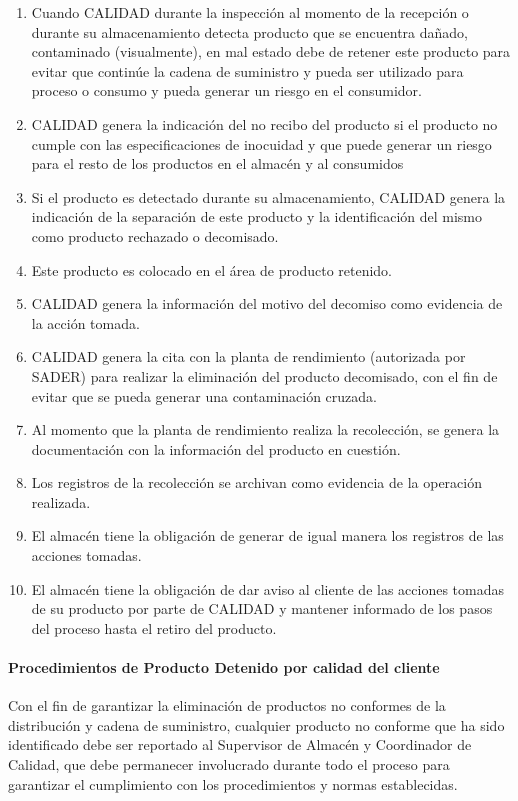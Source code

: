 \begin{enumerate}
	\item Cuando CALIDAD durante la inspección al momento de la recepción o durante su almacenamiento detecta producto que se encuentra dañado, contaminado (visualmente), en mal estado debe de retener este producto para evitar que continúe la cadena de suministro y pueda ser utilizado para proceso o consumo y pueda generar un riesgo en el consumidor.
	\item CALIDAD genera la indicación del no recibo del producto si el producto no cumple con las especificaciones de inocuidad y que puede generar un riesgo para el resto de los productos en el almacén y al consumidos
	\item Si el producto es detectado durante su almacenamiento, CALIDAD genera la indicación de la separación de este producto y la identificación del mismo como producto rechazado o decomisado.
	\item Este producto es colocado en el área de producto retenido.
	\item CALIDAD genera la información del motivo del decomiso como evidencia de la acción tomada.
	\item CALIDAD genera la cita con la planta de rendimiento (autorizada por SADER) para realizar la eliminación del producto decomisado, con el fin de evitar que se pueda generar una contaminación cruzada.
	\item Al momento que la planta de rendimiento realiza la recolección, se genera la documentación con la información del producto en cuestión.
	\item Los registros de la recolección se archivan como evidencia de la operación realizada.
	\item El almacén tiene la obligación de generar de igual manera los registros de las acciones tomadas.
	\item El almacén tiene la obligación de dar aviso al cliente de las acciones tomadas de su producto por parte de CALIDAD y mantener informado de los pasos del proceso hasta el retiro del producto.
\end{enumerate}

\paragraph{Procedimientos de Producto Detenido por calidad del cliente}

Con el fin de garantizar la eliminación de productos no conformes de la distribución y cadena de suministro, cualquier producto no conforme que ha sido identificado debe ser reportado al Supervisor de Almacén y Coordinador de Calidad, que debe permanecer involucrado durante todo el proceso para garantizar el cumplimiento con los procedimientos y normas establecidas.


